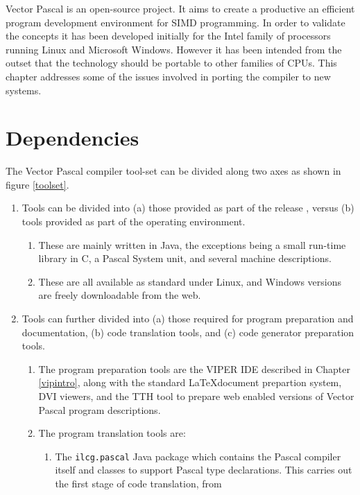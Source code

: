 \label{porting}
Vector Pascal is an open-source project. It aims to create
a productive an efficient program development environment for
SIMD programming. In order to validate the concepts it has
been developed initially for the Intel family of processors
running Linux and Microsoft Windows. However it has been intended
from the outset that the technology should be portable to other
families of CPUs. This chapter addresses some of the issues
involved in porting the compiler to new systems.

\section{Dependencies}

The Vector Pascal compiler tool-set can be divided along two axes
as shown in figure \ref{toolset}. \begin{enumerate}
\item Tools can be divided into (a) those provided as part of the release , versus (b) tools provided
      as part of the operating environment.
     \begin{enumerate}
	\item These are mainly written in Java, the exceptions being a  small run-time
              library in C, a Pascal System unit, and several machine descriptions.
        \item These are all available as standard under Linux, and Windows versions
              are freely downloadable from the web.
     \end{enumerate}
\item Tools can further divided into (a) those required for program preparation
and documentation, (b) code translation tools, and (c) code generator preparation tools.
     \begin{enumerate}
       \item The program preparation tools are the VIPER IDE described in Chapter \ref{vipintro},
       along with the standard \LaTeX document prepartion system, DVI viewers, and the
       TTH tool to prepare web enabled versions of Vector Pascal program descriptions.
       \item The program translation tools are:
            \begin{enumerate}
             \item The {\tt ilcg.pascal} Java package which
             contains the Pascal compiler itself and classes to support Pascal type
             declarations. This carries out the first stage of code translation, from

\end{enumerate}
\end{enumerate}
\end{enumerate}
